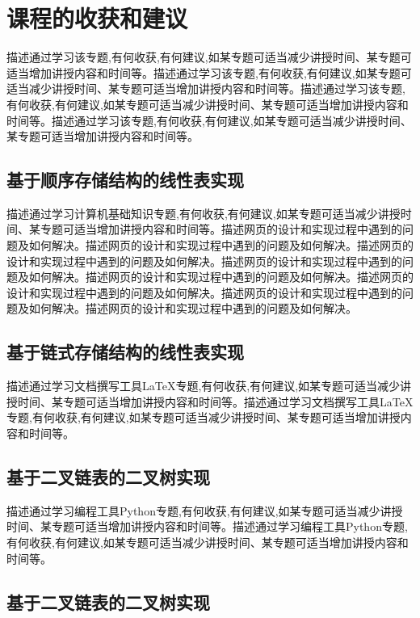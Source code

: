 \documentclass[supercite]{Experimental_Report}
\theoremstyle{definition}
\begin{document}
\section{课程的收获和建议}

描述通过学习该专题,有何收获,有何建议,如某专题可适当减少讲授时间、某专题可适当增加讲授内容和时间等。描述通过学习该专题,有何收获,有何建议,如某专题可适当减少讲授时间、某专题可适当增加讲授内容和时间等。描述通过学习该专题,有何收获,有何建议,如某专题可适当减少讲授时间、某专题可适当增加讲授内容和时间等。描述通过学习该专题,有何收获,有何建议,如某专题可适当减少讲授时间、某专题可适当增加讲授内容和时间等。

\subsection{基于顺序存储结构的线性表实现}

描述通过学习计算机基础知识专题,有何收获,有何建议,如某专题可适当减少讲授时间、某专题可适当增加讲授内容和时间等。描述网页的设计和实现过程中遇到的问题及如何解决。描述网页的设计和实现过程中遇到的问题及如何解决。描述网页的设计和实现过程中遇到的问题及如何解决。描述网页的设计和实现过程中遇到的问题及如何解决。描述网页的设计和实现过程中遇到的问题及如何解决。描述网页的设计和实现过程中遇到的问题及如何解决。描述网页的设计和实现过程中遇到的问题及如何解决。描述网页的设计和实现过程中遇到的问题及如何解决。

\subsection{基于链式存储结构的线性表实现}

描述通过学习文档撰写工具LaTeX专题,有何收获,有何建议,如某专题可适当减少讲授时间、某专题可适当增加讲授内容和时间等。描述通过学习文档撰写工具LaTeX专题,有何收获,有何建议,如某专题可适当减少讲授时间、某专题可适当增加讲授内容和时间等。

\subsection{基于二叉链表的二叉树实现}

描述通过学习编程工具Python专题,有何收获,有何建议,如某专题可适当减少讲授时间、某专题可适当增加讲授内容和时间等。描述通过学习编程工具Python专题,有何收获,有何建议,如某专题可适当减少讲授时间、某专题可适当增加讲授内容和时间等。

\subsection{基于二叉链表的二叉树实现}
\end{document}
